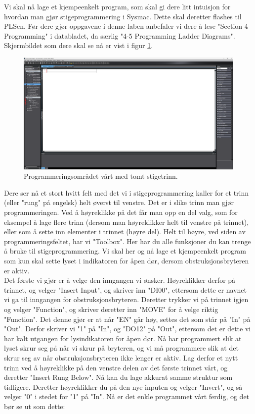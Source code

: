 \begin{alphasection}
Vi skal nå lage et kjempeenkelt program, som skal gi dere litt intuisjon for hvordan man gjør stigeprogrammering i Sysmac. Dette skal deretter flashes til PLSen. Før dere gjør oppgavene i denne laben anbefaler vi dere å lese "Section 4 Programming" i databladet, da særlig "4-5 Programming Ladder Diagrams". Skjermbildet som dere skal se nå er vist i figur \ref{fig:empty_rung}.

\begin{figure}[ht]
    \centering
    \includegraphics[scale=0.2]{Main/figures/empty_rung.png}
    \caption{Programmeringsområdet vårt med tomt stigetrinn.}
    \label{fig:empty_rung}
\end{figure}

Dere ser nå et stort hvitt felt med det vi i stigeprogrammering kaller for et trinn (eller "rung" på engelsk) helt øverst til venstre. Det er i slike trinn man gjør programmeringen. Ved å høyreklikke på det får man opp en del valg, som for eksempel å lage flere trinn (dersom man høyreklikker helt til venstre på trinnet), eller som å sette inn elementer i trinnet (høyre del). Helt til høyre, ved siden av programmeringsfeltet, har vi "Toolbox". Her har du alle funksjoner du kan trenge å bruke til stigeprogrammering. Vi skal her og nå lage et kjempeenkelt program som kun skal sette lyset i indikatoren for åpen dør, dersom obstruksjonsbryteren er aktiv.\\

Det første vi gjør er å velge den inngangen vi ønsker. Høyreklikker derfor på trinnet, og velger "Insert Input", og skriver inn "DI00", ettersom dette er navnet vi ga til inngangen for obstruksjonsbryteren. Deretter trykker vi på trinnet igjen og velger "Function", og skriver deretter inn "MOVE" for å velge riktig "Function". Det denne gjør er at når "EN" går høy, settes det som står på "In" på "Out". Derfor skriver vi "1" på "In", og "DO12" på "Out", ettersom det er dette vi har kalt utgangen for lysindikatoren for åpen dør. Nå har programmert slik at lyset skrur seg på når vi skrur på bryteren, og vi må programmere slik at det skrur seg av når obstruksjonsbryteren ikke lenger er aktiv. Lag derfor et nytt trinn ved å høyreklikke på den venstre delen av det første trinnet vårt, og deretter "Insert Rung Below". Nå kan du lage akkurat samme struktur som tidligere. Deretter høyreklikker du på den nye inputen og velger "Invert", og så velger "0" i stedet for "1" på "In". Nå er det enkle programmet vårt ferdig, og det bør se ut som dette:


\end{alphasection}
